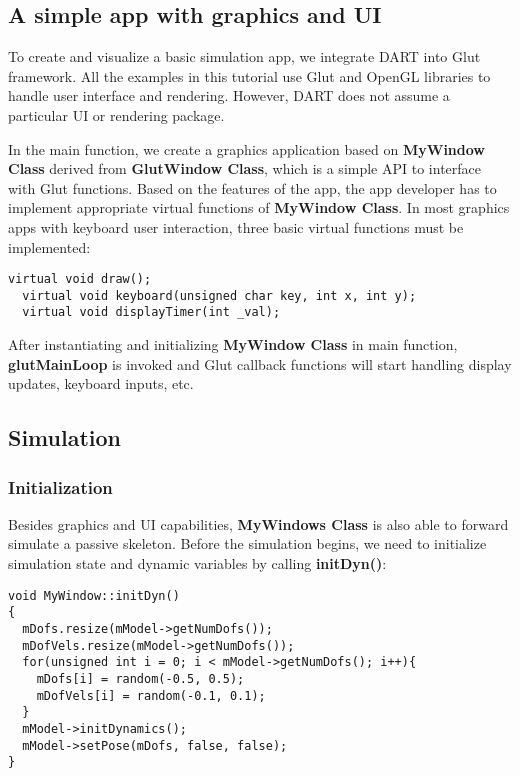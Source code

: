 \subsection{A simple app with graphics and UI}
To create and visualize a basic simulation app, we integrate DART into
Glut framework. All the examples in this tutorial use Glut and OpenGL
libraries to handle user interface and rendering. However, DART does
not assume a particular UI or rendering package.

In the main function, we create a graphics application based on
\textbf{MyWindow Class} derived from \textbf{GlutWindow Class}, which
is a simple API to interface with Glut functions. Based on the
features of the app, the app developer has to implement appropriate
virtual functions of \textbf{MyWindow Class}. In most graphics apps
with keyboard user interaction, three basic virtual functions must be
implemented:

\ttfamily
\begin{lstlisting}[caption=MyWindow.h]
  virtual void draw();
  virtual void keyboard(unsigned char key, int x, int y);
  virtual void displayTimer(int _val);
\end{lstlisting}
\rmfamily 

After instantiating and initializing \textbf{MyWindow Class} in main
function, \textbf{glutMainLoop} is invoked and Glut callback functions
will start handling display updates, keyboard inputs, etc.

\subsection{Simulation}
\subsubsection{Initialization}
Besides graphics and UI capabilities, \textbf{MyWindows Class} is also
able to forward simulate a passive skeleton. Before the simulation
begins, we need to initialize simulation state and dynamic variables
by calling \textbf{initDyn()}:

\ttfamily
\begin{lstlisting}[caption=MyWindow.cpp]
void MyWindow::initDyn()
{
  mDofs.resize(mModel->getNumDofs());
  mDofVels.resize(mModel->getNumDofs());
  for(unsigned int i = 0; i < mModel->getNumDofs(); i++){
    mDofs[i] = random(-0.5, 0.5);
    mDofVels[i] = random(-0.1, 0.1);
  }
  mModel->initDynamics();
  mModel->setPose(mDofs, false, false);
}
\end{lstlisting}
\rmfamily 

